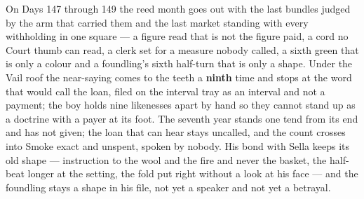 \documentclass{design/chronicle}
\begin{document}
{On Days 147 through 149 the reed month goes out with the last bundles judged by the arm that carried them and the last market standing with every withholding in one square --- a figure read that is not the figure paid, a cord no Court thumb can read, a clerk set for a measure nobody called, a sixth green that is only a colour and a foundling’s sixth half-turn that is only a shape. Under the Vail roof the near-saying comes to the teeth a \textbf{ninth} time and stops at the word that would call the loan, filed on the interval tray as an interval and not a payment; the boy holds nine likenesses apart by hand so they cannot stand up as a doctrine with a payer at its foot. The seventh year stands one tend from its end and has not given; the loan that can hear stays uncalled, and the count crosses into Smoke exact and unspent, spoken by nobody. His bond with Sella keeps its old shape --- instruction to the wool and the fire and never the basket, the half-beat longer at the setting, the fold put right without a look at his face --- and the foundling stays a shape in his file, not yet a speaker and not yet a betrayal.

}
\end{document}
